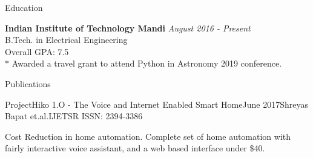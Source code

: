 \documentclass{resume} %
\begin{document}

\begin{rSection}{Education}

{\bf Indian Institute of Technology Mandi} \hfill {\em August 2016  - Present} \\ 
B.Tech. in Electrical Engineering \\
Overall GPA:  7.5\\
$*$  Awarded a travel grant to attend Python in Astronomy 2019 conference. 

\end{rSection}

\begin{rSection}{Publications}


\begin{rSubsection}{ProjectHiko 1.O - The Voice and Internet Enabled Smart Home}{June 2017}{Shreyas Bapat et.al.}{IJETSR ISSN: 2394-3386}
\item Cost Reduction in home automation. Complete set of home automation with fairly interactive voice assistant, and a web based interface under \$40. 
 \end{rSubsection}
\end{rSection}

\end{document}
